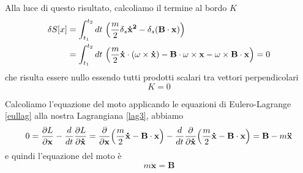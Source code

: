\begin{example}
    Alla luce di questo risultato, calcoliamo il termine al bordo $K$ 
\begin{equation}
\begin{aligned}
    \delta S[x] & = \int_{t_1}^{t_2}dt~ \Big( \frac{m}{2} \delta_s \mathbf{\dot x^2} - \delta_s (\mathbf B \cdot \mathbf x ) \Big ) \\ & = \int_{t_1}^{t_2}dt~ \Big( \frac{m}{2} \mathbf{\dot x} \cdot (\omega \times \mathbf{\dot x} ) - \mathbf B \cdot \omega \times \mathbf x - \omega \times \mathbf B \cdot \mathbf x \Big ) = 0
\end{aligned}
\end{equation}
    che risulta essere nullo essendo tutti prodotti scalari tra vettori perpendicolari
\begin{equation*}
    K = 0
\end{equation*}

    Calcoliamo l'equazione del moto applicando le equazioni di Eulero-Lagrange \eqref{eullag} alla nostra Lagrangiana \eqref{lag3}, abbiamo
\begin{equation*}
    0 = \frac{\partial L}{\partial\mathbf x}  - \frac{d}{dt} \frac{\partial L}{\partial\mathbf{\dot x}} = \frac{\partial}{\partial\mathbf x} \Big(\frac{m}{2} \mathbf{\dot x} - \mathbf B \cdot \mathbf x \Big) - \frac{d}{dt} \frac{\partial}{\partial\mathbf{\dot x}} \Big(\frac{m}{2} \mathbf{\dot x} - \mathbf B \cdot \mathbf x \Big) = \mathbf B - m \mathbf{\ddot x}
\end{equation*}
    e quindi l'equazione del moto è
\begin{equation}\label{eqmoto3}
    m \mathbf{\ddot x} = \mathbf B
\end{equation}


\end{example}
